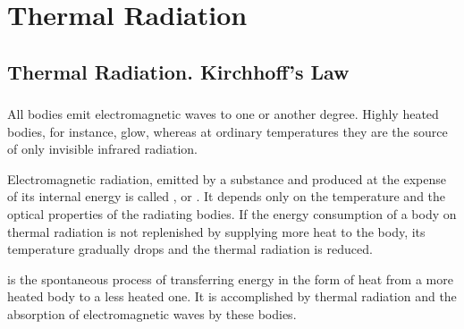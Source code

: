 



\chapter{Thermal Radiation}
\label{ch-36}

\section{Thermal Radiation. Kirchhoff's Law}
\label{sec-36.1} 


\subsection{}\label{36.1.1} All bodies emit electromagnetic waves to one or another degree. Highly heated bodies, for instance, glow, whereas at ordinary temperatures they are the source of only invisible infrared radiation.

Electromagnetic radiation, emitted by a substance and produced
at the expense of its internal energy  is called , or . It depends only on the temperature and the optical properties of the radiating bodies. If the energy consumption of a body on thermal radiation is not replenished by supplying more heat to the body, its temperature gradually drops and the thermal radiation is reduced.

 is the spontaneous process of transferring energy in the form of heat from a more heated body to a less heated one. It is accomplished by thermal radiation and the absorption of electromagnetic waves by these bodies.

